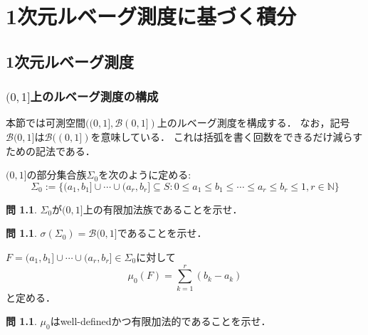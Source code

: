 \documentclass{jsreport}
\theoremstyle{definition}
\newtheorem{qst}[defi]{問}
\begin{document}
\part{1次元ルベーグ測度に基づく積分}

\chapter{1次元ルベーグ測度}

\section{$(0,1]$上のルベーグ測度の構成}

本節では可測空間$((0,1],\mathcal{B}(0,1])$上のルベーグ測度を構成する．
なお，記号$\mathcal{B}(0,1]$は$\mathcal{B}((0,1])$を意味している．
これは括弧を書く回数をできるだけ減らすための記法である．

$(0,1]$の部分集合族$\Sigma_0$を次のように定める:
\[ \Sigma_0:=\{(a_1,b_1]\cup\cdots\cup(a_r,b_r] \subseteq S:
0 \leq a_1 \leq b_1 \leq \cdots \leq a_r \leq b_r \leq 1, r\in\mathbb{N}\} \]

\begin{qst}\label{qst_check_that_Sigma_0_is_algebra}
$\Sigma_0$が$(0,1]$上の有限加法族であることを示せ．
\end{qst}

\begin{qst}\label{qst_check_that_Borel_01_is_generated}
$\sigma(\Sigma_0)=\mathcal{B}(0,1]$であることを示せ．
\end{qst}


$F=(a_1,b_1]\cup\cdots\cup(a_r,b_r]\in\Sigma_0$に対して
\[ \mu_0(F)=\sum_{k=1}^r(b_k-a_k) \]
と定める．

\begin{qst}\label{qst_check_that_mu_0_is_well-defined_and_additive}
$\mu_0$はwell-definedかつ有限加法的であることを示せ．
\end{qst}
\end{document}
